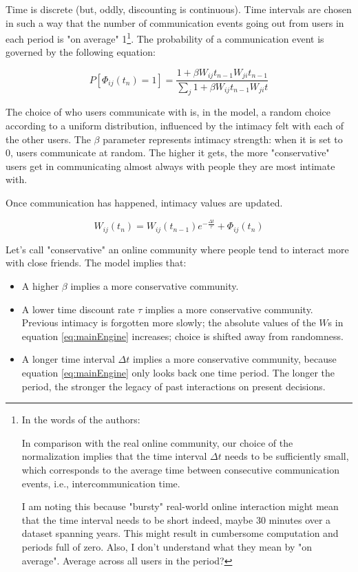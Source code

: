\documentclass{article}
\begin{document}
Time is discrete (but, oddly, discounting is continuous). Time intervals are chosen in such a way that the number of communication events going out from users in each period is "on average" 1\footnote {In the words of the authors: 
\begin{displayquote}
	In comparison with the real online community, our choice of the normalization implies that the time interval $\Delta t$ needs to be sufficiently small, which corresponds to the average time between consecutive communication events, i.e., intercommunication time.
\end{displayquote}

I am noting this because "bursty" real-world online interaction might mean that the time interval needs to be short indeed, maybe 30 minutes over a dataset spanning years. This might result in cumbersome computation and periods full of zero. Also, I don't understand what they mean by "on average". Average across all users in the period?}. The probability of a communication event is governed by the following equation:

\begin{equation}
 	P [\Phi_{ij}(t_n) = 1] = \frac{1 + \beta W_{ij}t_{n-1} W_{ji}t_{n-1}}{\sum_j 1 + \beta W_{ij}t_{n-1} W_{ji}t}
	\label{eq:mainEngine}
 \end {equation}

The choice of who users communicate with is, in the model, a random choice according to a uniform distribution, influenced by the intimacy felt with each of the other users. The $\beta$ parameter represents intimacy strength: when it is set to 0, users communicate at random. The higher it gets, the more "conservative" users get in communicating almost always with people they are most intimate with. 

Once communication has happened, intimacy values are updated. 

\begin{equation}
	W_{ij}(t_n) = W_{ij}(t_{n-1})e^{-\frac{\Delta t}{\tau}} + \Phi_{ij}(t_n)
\end{equation}

Let's call "conservative" an online community where people tend to interact more with close friends. The model implies that:

\begin{itemize}
	\item A higher $\beta$ implies a more conservative community. 
	\item A lower time discount rate $\tau$ implies a more conservative community. Previous intimacy is forgotten more slowly; the absolute values of the $W$s in equation \ref{eq:mainEngine} increases; choice is shifted away from randomness.
	\item A longer time interval $\Delta t$ implies a more conservative community, because equation \ref{eq:mainEngine} only looks back one time period. The longer the period, the stronger the legacy of past interactions on present decisions.
\end{itemize}
\end{document}
